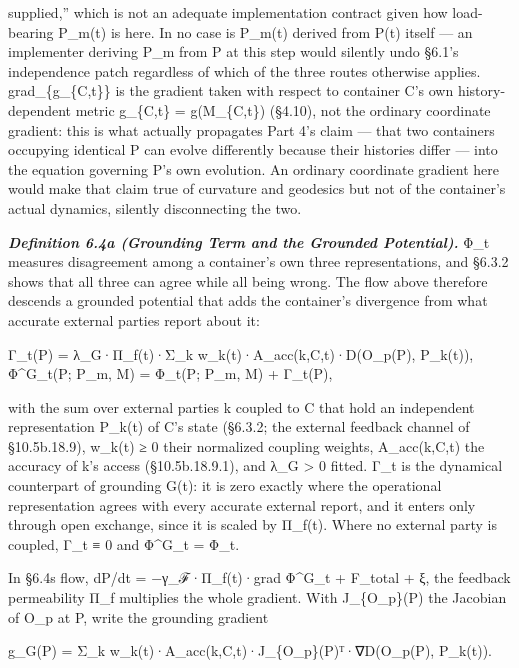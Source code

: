 \documentclass[
]{article}
\begin{document}
supplied,'' which is not an adequate implementation contract given how
load-bearing P\_m(t) is here. In no case is P\_m(t) derived from P(t)
itself --- an implementer deriving P\_m from P at this step would
silently undo §6.1's independence patch regardless of which of the three
routes otherwise applies. grad\_\{g\_\{C,t\}\} is the gradient taken
with respect to container C's own history-dependent metric g\_\{C,t\} =
g(M\_\{C,t\}) (§4.10), not the ordinary coordinate gradient: this is
what actually propagates Part 4's claim --- that two containers
occupying identical P can evolve differently because their histories
differ --- into the equation governing P's own evolution. An ordinary
coordinate gradient here would make that claim true of curvature and
geodesics but not of the container's actual dynamics, silently
disconnecting the two.

\emph{\textbf{Definition 6.4a (Grounding Term and the Grounded
Potential).}} Φ\_t measures disagreement among a container's own three
representations, and §6.3.2 shows that all three can agree while all
being wrong. The flow above therefore descends a grounded potential that
adds the container's divergence from what accurate external parties
report about it:

Γ\_t(P) = λ\_G·Π\_f(t)·Σ\_k w\_k(t)·A\_acc(k,C,t)·D(O\_p(P), P\_k(t)),
Φ\^{}G\_t(P; P\_m, M) = Φ\_t(P; P\_m, M) + Γ\_t(P),

with the sum over external parties k coupled to C that hold an
independent representation P\_k(t) of C's state (§6.3.2; the external
feedback channel of §10.5b.18.9), w\_k(t) ≥ 0 their normalized coupling
weights, A\_acc(k,C,t) the accuracy of k's access (§10.5b.18.9.1), and
λ\_G \textgreater{} 0 fitted. Γ\_t is the dynamical counterpart of
grounding G(t): it is zero exactly where the operational representation
agrees with every accurate external report, and it enters only through
open exchange, since it is scaled by Π\_f(t). Where no external party is
coupled, Γ\_t ≡ 0 and Φ\^{}G\_t = Φ\_t.

In §6.4\textquotesingle s flow, dP/dt = −γ\_ℱ·Π\_f(t)·grad Φ\^{}G\_t +
F\_total + ξ, the feedback permeability Π\_f multiplies the whole
gradient. With J\_\{O\_p\}(P) the Jacobian of O\_p at P, write the
grounding gradient

g\_G(P) = Σ\_k w\_k(t)·A\_acc(k,C,t)·J\_\{O\_p\}(P)ᵀ·∇D(O\_p(P),
P\_k(t)).
\end{document}
